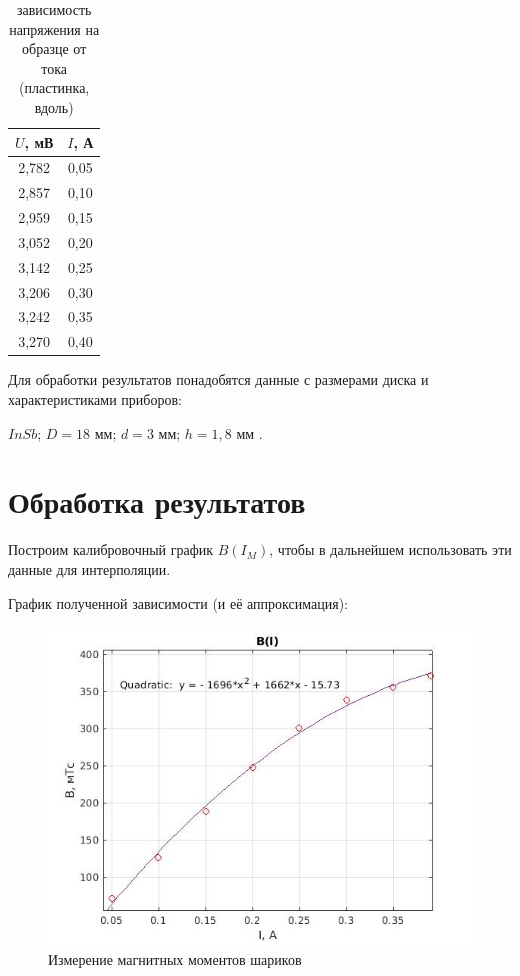 \documentclass[a4paper, 12pt]{article}%
\begin{document}
\begin{table}[!h]
\begin{center}
\begin{tabular}{|c|c|}
\hline	$U$, мВ  & $I$, А  \\
\hline 2,782 & 0,05 \\
\hline 2,857 & 0,10 \\
\hline 2,959 & 0,15 \\
\hline 3,052 & 0,20 \\
\hline 3,142 & 0,25 \\
\hline 3,206 & 0,30 \\
\hline 3,242 & 0,35 \\
\hline 3,270 & 0,40 \\
\hline
\end{tabular}
\end{center}
\caption{зависимость напряжения на образце от тока (пластинка, вдоль)}
\end{table}


Для обработки результатов понадобятся данные с размерами диска и характеристиками приборов:

$InSb$; $D = 18\text{ мм}$; $d = 3\text{ мм}$; $h = 1,8\text{ мм}$ .





\section{Обработка результатов}

Построим калибровочный график $B(I_M)$, чтобы в дальнейшем использовать эти данные для интерполяции.


График полученной зависимости (и её аппроксимация):

\newpage

\begin{center}
\begin{figure}[h]
    \centering
    \includegraphics[width = 10 cm]{B(I).jpg}
    \caption{Измерение магнитных моментов шариков}
    \label{msh1}
\end{figure}
\end{center}
\end{document}
